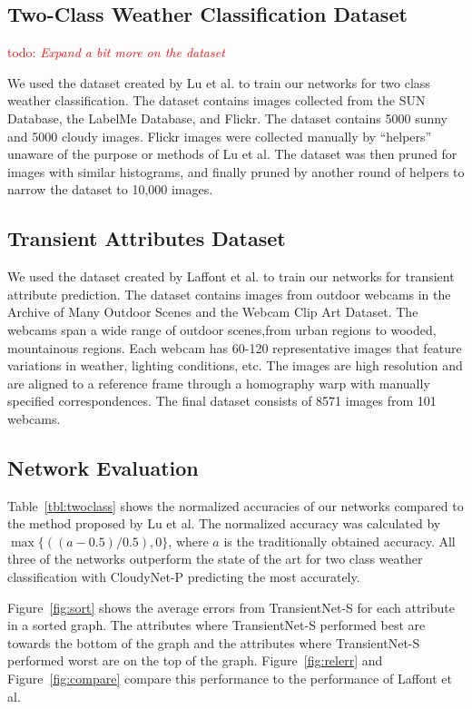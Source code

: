 \documentclass{article}
\newcommand{\todo}[1]{\textcolor{red}{todo: {\em #1}}}
\newcommand{\figref}[1]{Figure~\ref{fig:#1}}
\newcommand{\tblref}[1]{Table~\ref{tbl:#1}}
\begin{document}
\subsection{Two-Class Weather Classification Dataset}
\todo{Expand a bit more on the dataset}
\indent

We used the dataset created by Lu\cite{lutwoclass} et al. to train our networks
for two class weather classification.  The dataset contains images collected from
the SUN Database\cite{xiaoSUN}, the LabelMe Database\cite{russell2008labelme}, and
Flickr. The dataset contains 5000 sunny and 5000 cloudy images. Flickr images were 
collected manually by ``helpers'' unaware of the purpose or methods of
Lu et al. The dataset was then pruned for images with similar
histograms, and finally pruned by another round of helpers to narrow
the dataset to 10,000 images. 

\subsection{Transient Attributes Dataset}
\indent

We used the dataset created by Laffont\cite{Laffont14} et al. to train our 
networks for transient attribute prediction. The dataset contains images from 
outdoor webcams in the Archive of Many Outdoor Scenes\cite{jacobs07amos} and 
the Webcam Clip Art Dataset\cite{lalondesig09}.  The webcams span a wide range 
of outdoor scenes,from urban regions to wooded, mountainous regions. Each webcam 
has 60-120 representative images that feature variations in weather, lighting 
conditions, etc.  The images are high resolution and are aligned to a reference 
frame through a homography warp with manually specified correspondences.  The 
final dataset consists of 8571 images from 101 webcams.

\subsection{Network Evaluation}
\indent

\tblref{twoclass} shows the normalized accuracies of our networks compared to 
the method proposed by Lu\cite{lutwoclass} et al.  The normalized accuracy was
calculated by $ \max\{((a - 0.5) / 0.5), 0\} $, where $a$ is the traditionally
obtained accuracy. All three of the networks outperform the state of the art for
two class weather classification with CloudyNet-P predicting the most accurately.

\figref{sort} shows the average errors from TransientNet-S for each attribute
in a sorted graph.  The attributes where TransientNet-S performed best are towards
the bottom of the graph and the attributes where TransientNet-S performed
worst are on the top of the graph. \figref{relerr} and \figref{compare} 
compare this performance to the performance of Laffont et al.
\end{document}
